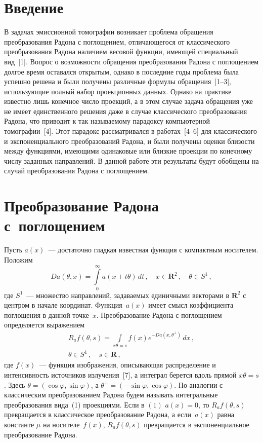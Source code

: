       \begin{multicols}{2}

      \label{st\stat}
      
\section{Введение}

В задачах эмиссионной томографии возникает проблема
обращения преобразования Радона с поглощением, отличающегося от классического преобразования 
Радона наличием весовой функции, имеющей специальный вид~[1]. Вопрос о возможности обращения 
преобразования Радона с поглощением долгое время оставался открытым, однако в последние годы 
проблема была успешно решена и были получены различные формулы обращения~[1--3], 
использующие полный набор проекционных данных. Однако на практике известно лишь конечное 
число проекций, а в этом случае задача обращения уже не имеет единственного решения даже 
в случае классического преобразования Радона, что приводит к так называемому парадоксу 
компьютерной томографии~[4]. Этот парадокс рассматривался в работах~[4--6] для классического 
и экспоненциального преобразований Радона, и были получены оценки близости между функциями, имеющими 
одинаковые или близкие проекции по конечному числу заданных направлений. В данной работе эти результаты 
будут обобщены на случай преобразования Радона с поглощением.

\section{Преобразование Радона с~поглощением}

Пусть $a(x)$~--- достаточно гладкая известная функция с компактным носителем. Положим
$$
Da(\theta, x)=\int\limits_{0}^{\infty}a(x+t\theta)\,dt\,,
\quad x\in\mathbf{R}^2\,,\quad \theta\in S^1\,,
$$
где $S^1$~--- множество направлений, задаваемых единичными векторами в
$\mathbf{R}^2$ с центром в начале координат. Функция~$a(x)$ имеет смысл коэффициента поглощения в данной точке~$x$. 
Преобразование Радона с поглощением определяется выражением
\begin{multline}
R_af(\theta,s)=\int\limits_{x\theta=s}f(x)e^{-Da(x,\theta^{\perp})}\,dx\,,\\
\theta\in S^1\,,\quad s\in\mathbf{R}\,,
\end{multline}
где $f(x)$~--- функция
изображения, описывающая распределение и интенсивность источников излучения~[7], а
интеграл берется вдоль прямой $x \theta=s$.
Здесь $\theta=(\cos\varphi,\sin\varphi)$, а
$\theta^{\perp}=(-\sin\varphi,\cos\varphi)$. По аналогии с классическим преобразованием 
Радона будем называть интегральные преобразования вида~(1) проекциями. Если в $(1)$ $a(x)=0$, то
$R_af(\theta,s)$ превращается в классическое преобразование
Радона, а если~$a(x)$ равна константе $\mu$ на носителе~$f(x)$,
$R_af(\theta,s)$ превращается в экспоненциальное преобразование
Радона.


\end{multicols}
